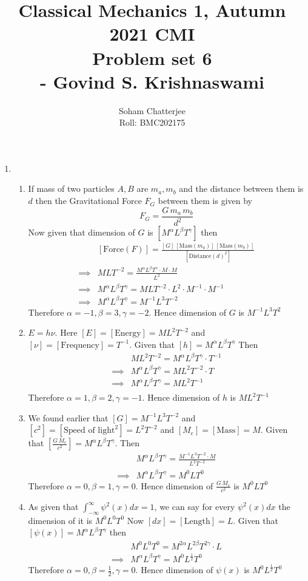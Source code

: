 \documentclass{article}
\title{\huge{Classical Mechanics 1, Autumn 2021 CMI \\ Problem set 6\\\hspace{7cm}- Govind S. Krishnaswami}
}
\author{Soham Chatterjee\\Roll: BMC202175}
\date{}
\begin{document}
	\maketitle\pagebreak
	\begin{enumerate}
		\item \begin{enumerate}
			\item If mass of two particles $A,B$ are $m_a,m_b$ and the distance between them is $d$ then the Gravitational Force $F_G$ between them is given by $$F_G=\frac{G\,m_a\,m_b}{d^2}$$Now given that dimension of $G$ is $[{M^{\alpha}L^{\beta}T^{\gamma}}]$ then \begin{align*}
				& [\text{Force}(F)]=\frac{[G]\, [\text{Mass}(m_a)]\,[\text{Mass}(m_b)]}{[\text{Distance}(d)^2]}\\
				\implies &MLT^{-2}=\frac{{M^{\alpha}L^{\beta}T^{\gamma}}\cdot M\cdot M}{L^2}\\
				\implies & {M^{\alpha}L^{\beta}T^{\gamma}}=MLT^{-2}\cdot L^2\cdot M^{-1}\cdot M^{-1}\\
				\implies & {M^{\alpha}L^{\beta}T^{\gamma}}=M^{-1}L^3T^{-2}
			\end{align*}Therefore $\alpha=-1,\beta=3,\gamma=-2$. Hence dimension of $G$ is $M^{-1}L^3T^2$
		\item $E=h\nu$. Here $[E]=[\text{Energy}] =ML^2T^{-2}$ and $[\nu]=[\text{Frequency}]=T^{-1}$. Given that $[h]=M^{\alpha}L^{\beta}T^{\gamma}$ Then \begin{align*}
			&ML^2T^{-2}=M^{\alpha}L^{\beta}T^{\gamma}\cdot T^{-1}\\
			\implies & M^{\alpha}L^{\beta}T^{\gamma}=ML^2T^{-2}\cdot T\\
			\implies & M^{\alpha}L^{\beta}T^{\gamma}=ML^2T^{-1}\\
		\end{align*}Therefore $\alpha=1,\beta=2,\gamma=-1$. Hence dimension of $h$ is $ML^2T^{-1}$
 \item We found earlier that $[G]=M^{-1}L^3T^{-2}$ and $[c^2]=[\text{Speed of light}^2]=L^2T^{-2}$ and $[M_e]=[\text{Mass}]=M$. Given that $\left[\frac{G\, M_e}{c^2}\right]=M^{\alpha}L^{\beta}T^{\gamma}  $. Then\begin{align*}
 	& M^{\alpha}L^{\beta}T^{\gamma}=\frac{M^{-1}L^3T^{-2}\cdot M}{L^2T^{-2}}\\
 	\implies & M^{\alpha}L^{\beta}T^{\gamma}=M^0LT^0
 \end{align*}Therefore $\alpha=0,\beta=1,\gamma=0$. Hence dimension of $\frac{G\, M_e}{c^2}$ is $M^0LT^0$
\item As given that $\int^{\infty}_{-\infty}\psi^2(x)dx=1$, we can say for every $\psi^2(x)dx$ the dimension of it is $M^0L^0T^0$ Now $[dx]=[\text{Length}]=L$. Given that $[\psi(x)]=M^{\alpha}L^{\beta}T^{\gamma}$ then\begin{align*}
	&M^0L^0T^0=M^{2\alpha}L^{2\beta}T^{2\gamma}\cdot L\\
	\implies&M^{\alpha}L^{\beta}T^{\gamma}=M^0L^{\frac12}T^0
\end{align*}Therefore $\alpha=0,\beta=\frac12,\gamma=0$. Hence dimension of $\psi(x)$ is $M^0L^{\frac12}T^0$
			\end{enumerate}
		

\end{enumerate}
\end{document}
